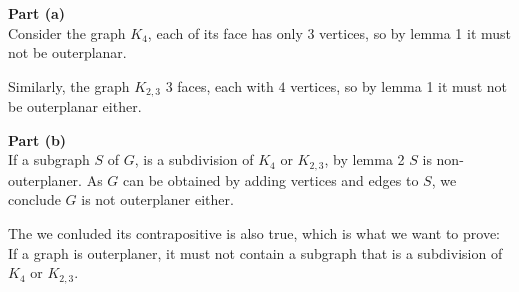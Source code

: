 \documentclass{article}
\begin{document}
\textbf{Part (a)}\\

Consider the graph $K_4$, each of its face has only $3$ vertices, so by lemma 1 it must not be outerplanar.

Similarly, the graph $K_{2,3}$ 3 faces, each with $4$ vertices, so by lemma 1 it must not be outerplanar either.

\textbf{Part (b)}\\
If a subgraph $S$ of $G$, is a subdivision of $K_4$ or $K_{2,3}$, by lemma 2 $S$ is non-outerplaner. As $G$ can be obtained by adding vertices and edges to $S$, we conclude $G$ is not outerplaner either.
	
The we conluded its contrapositive is also true, which is what we want to prove: If a graph is outerplaner, it must not contain a subgraph that is a subdivision of $K_4$ or $K_{2,3}$.
\end{document}

